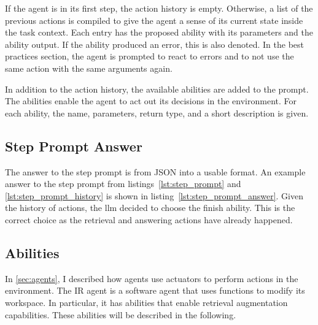 \documentclass[../main.tex]{subfiles}
\begin{document}
If the agent is in its first step, the action history is empty.
Otherwise, a list of the previous actions is compiled to give the agent a sense of its current state inside the task context.
Each entry has the proposed ability with its parameters and the ability output.
If the ability produced an error, this is also denoted.
In the best practices section, the agent is prompted to react to errors and to not use the same action with the same arguments again.

In addition to the action history, the available abilities are added to the prompt.
The abilities enable the agent to act out its decisions in the environment.
For each ability, the name, parameters, return type, and a short description is given.

\subsection{Step Prompt Answer}

The answer to the step prompt is from JSON into a usable format.
An example answer to the step prompt from listings~\ref{lst:step_prompt} and \ref{lst:step_prompt_history}
is shown in listing~\ref{lst:step_prompt_answer}.
Given the history of actions, the \gls{llm} decided to choose the finish
ability.
This is the correct choice as the retrieval and answering actions have
already happened.



\subsection{Abilities}

In \autoref{sec:agents}, I described how agents use actuators to perform actions in the environment.
The IR agent is a software agent that uses functions to modify its workspace.
In particular, it has abilities that enable retrieval augmentation capabilities.
These abilities will be described in the following.
\end{document}
